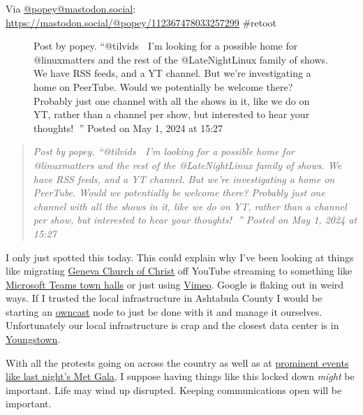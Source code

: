 Via \href{https://mastodon.social/@popey/}{@popey@mastodon.social}:
\url{https://mastodon.social/@popey/112367478033257299} \#retoot

\begin{figure}
\centering
{}
\caption{Post by popey. ``@tilvids 👋 I'm looking for a possible home
for @linuxmatters and the rest of the @LateNightLinux family of shows.
We have RSS feeds, and a YT channel. But we're investigating a home on
PeerTube. Would we potentially be welcome there? Probably just one
channel with all the shows in it, like we do on YT, rather than a
channel per show, but interested to hear your thoughts! 🙏'' Posted on
May 1, 2024 at 15:27}
\end{figure}

\begin{quote}
\emph{Post by popey. ``@tilvids 👋 I'm looking for a possible home for
@linuxmatters and the rest of the @LateNightLinux family of shows. We
have RSS feeds, and a YT channel. But we're investigating a home on
PeerTube. Would we potentially be welcome there? Probably just one
channel with all the shows in it, like we do on YT, rather than a
channel per show, but interested to hear your thoughts! 🙏'' Posted on
May 1, 2024 at 15:27}
\end{quote}

I only just spotted this today. This could explain why I've been looking
at things like migrating
\href{https://www.genevachurchofchrist.org}{Geneva Church of Christ} off
YouTube streaming to something like
\href{https://support.microsoft.com/en-us/office/get-started-with-town-hall-in-microsoft-teams-33baf0c6-0283-4c15-9617-3013e8d4804f}{Microsoft
Teams town halls} or just using
\href{https://vimeo.com/features/livestreaming}{Vimeo}. Google is
flaking out in weird ways. If I trusted the local infrastructure in
Ashtabula County I would be starting an
\href{https://owncast.online}{owncast} node to just be done with it and
manage it ourselves. Unfortunately our local infrastructure is crap and
the closest data center is in
\href{https://en.wikipedia.org/w/index.php?title=Youngstown,_Ohio&oldid=1221588283}{Youngstown}.

With all the protests going on across the country as well as at
\href{https://www.cbsnews.com/newyork/video/dozens-arrested-after-hunter-college-protesters-try-to-reach-met-gala/}{prominent
events like last night's Met Gala}, I suppose having things like this
locked down \emph{might} be important. Life may wind up disrupted.
Keeping communications open will be important.
